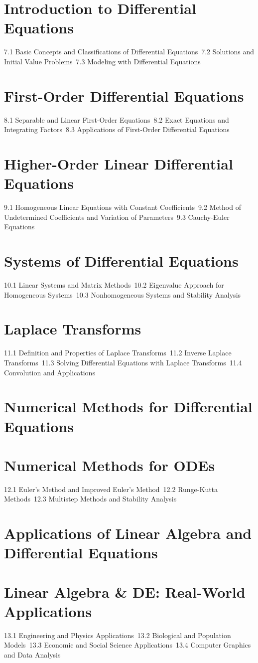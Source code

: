 \section{Introduction to Differential Equations}
7.1 Basic Concepts and Classifications of Differential Equations\
7.2 Solutions and Initial Value Problems\
7.3 Modeling with Differential Equations\
\section{First-Order Differential Equations}
8.1 Separable and Linear First-Order Equations\
8.2 Exact Equations and Integrating Factors\
8.3 Applications of First-Order Differential Equations\
\section{Higher-Order Linear Differential Equations}
9.1 Homogeneous Linear Equations with Constant Coefficients\
9.2 Method of Undetermined Coefficients and Variation of Parameters\
9.3 Cauchy-Euler Equations\
\section{Systems of Differential Equations}
10.1 Linear Systems and Matrix Methods\
10.2 Eigenvalue Approach for Homogeneous Systems\
10.3 Nonhomogeneous Systems and Stability Analysis\
\section{Laplace Transforms}
11.1 Definition and Properties of Laplace Transforms\
11.2 Inverse Laplace Transforms\
11.3 Solving Differential Equations with Laplace Transforms\
11.4 Convolution and Applications\
\section{Numerical Methods for Differential Equations}
\section{Numerical Methods for ODEs}
12.1 Euler's Method and Improved Euler's Method\
12.2 Runge-Kutta Methods\
12.3 Multistep Methods and Stability Analysis\
\section{Applications of Linear Algebra and Differential Equations}
\section{Linear Algebra \& DE: Real-World Applications}
13.1 Engineering and Physics Applications\
13.2 Biological and Population Models\
13.3 Economic and Social Science Applications\
13.4 Computer Graphics and Data Analysis\
